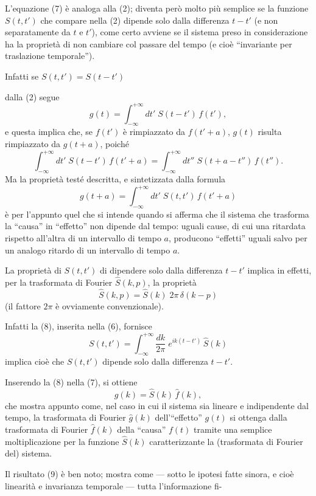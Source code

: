 \documentclass[11pt, a4paper]{book}
\numberwithin{equation}{section}
\begin{document}
\medskip
L'equazione (7) è analoga alla (2); diventa però molto più semplice se
la funzione $S(t,t')$ che compare nella (2) dipende solo dalla differenza $t-t'$
(e non separatamente da $t$ e $t'$), come certo avviene se il sistema preso in
considerazione ha la proprietà di non cambiare col passare del tempo (e cioè
``invariante per traslazione temporale'').

\medskip
Infatti se $S(t,t') = S(t-t')$


dalla (2) segue
\[
    g(t) = \int_{-\infty}^{+\infty} dt'\; S(t-t')\, f(t'),
\]
e questa implica che, se $f(t')$ è rimpiazzato da $f(t'+a)$, $g(t)$ risulta
rimpiazzato da $g(t+a)$, poiché
\[
    \int_{-\infty}^{+\infty} dt'\; S(t-t')\, f(t'+a) = \int_{-\infty}^{+\infty} dt''\; S(t+a-t'')\, f(t'').
\]
Ma la proprietà testé descritta, e sintetizzata dalla formula
\[
    g(t+a) = \int_{-\infty}^{+\infty} dt'\; S(t,t')\, f(t'+a)
\]
è per l'appunto quel che si intende quando si afferma che il sistema che
trasforma la ``causa'' in ``effetto'' non dipende dal tempo: uguali cause, di
cui una ritardata rispetto all'altra di un intervallo di tempo $a$, producono
``effetti'' uguali salvo per un analogo ritardo di un intervallo di tempo $a$.

\medskip
La proprietà di $S(t,t')$ di dipendere solo dalla differenza $t-t'$ implica
in effetti, per la trasformata di Fourier $\hat{S}(k,p)$, la proprietà
\begin{equation}
    \hat{S}(k,p) = \hat{S}(k)\; 2\pi\,\delta(k-p) \tag{8}
\end{equation}
(il fattore $2\pi$ è ovviamente convenzionale).

Infatti la (8), inserita nella (6), fornisce
\[
    S(t,t') = \int_{-\infty}^{+\infty}\frac{dk}{2\pi}\; e^{ik(t-t')}\,\hat{S}(k)
\]
implica cioè che $S(t,t')$ dipende solo dalla differenza $t-t'$.

Inserendo la (8) nella (7), si ottiene
\begin{equation}
    \hat{g}(k) = \hat{S}(k)\,\hat{f}(k), \tag{9}
\end{equation}
che mostra appunto come, nel caso in cui il sistema sia lineare e indipendente
dal tempo, la trasformata di Fourier $\hat{g}(k)$ dell'``effetto'' $g(t)$ si
ottenga dalla trasformata di Fourier $\hat{f}(k)$ della ``causa'' $f(t)$ tramite
una semplice moltiplicazione per la funzione $\hat{S}(k)$ caratterizzante la
(trasformata di Fourier del) sistema.

Il risultato (9) è ben noto; mostra come --- sotto le ipotesi fatte sinora,
e cioè linearità e invarianza temporale --- tutta l'informazione fi-
\end{document}
